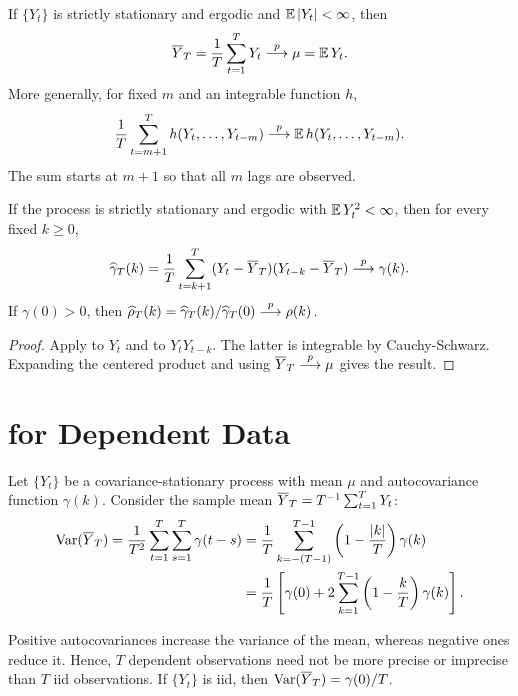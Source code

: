 \documentclass[a4paper,12pt]{article}
\begin{document}
\begin{theorem}\label{thm-ergodic}
	If $\{Y_t\}$ is strictly stationary and ergodic and $\operatorname{\mathbb{E}}|Y_t|<\infty$, then
	\begin{align}
		\overline Y_T=\frac1T\sum_{t=1}^T Y_t\overset{p}{\longrightarrow}\mu=\operatorname{\mathbb{E}} Y_t.
	\end{align}
	More generally, for fixed $m$ and an integrable function $h$,
	\begin{align}
		\frac1T\sum_{t=m+1}^T h(Y_t,\ldots,Y_{t-m})
		\overset{p}{\longrightarrow} \operatorname{\mathbb{E}} h(Y_t,\ldots,Y_{t-m}).
	\end{align}
	The sum starts at $m+1$ so that all $m$ lags are observed.
\end{theorem}

\begin{corollary}\label{cor-sample-acf}
	If the process is strictly stationary and ergodic with $\operatorname{\mathbb{E}} Y_t^2<\infty$, then for every fixed $k\ge0$,
	\begin{align}
		\widehat\gamma_T(k)
		=\frac1T\sum_{t=k+1}^T(Y_t-\overline Y_T)(Y_{t-k}-\overline Y_T)\overset{p}{\longrightarrow}\gamma(k).
	\end{align}
	If $\gamma(0)>0$, then $\widehat\rho_T(k)=\widehat\gamma_T(k)/\widehat\gamma_T(0)\overset{p}{\longrightarrow}\rho(k)$.
\end{corollary}
\begin{proof}
	Apply  to $Y_t$ and to $Y_tY_{t-k}$.
	The latter is integrable by Cauchy-Schwarz.
	Expanding the centered product and using $\overline Y_T\overset{p}{\longrightarrow}\mu$ gives the result.
\end{proof}

\section{ for Dependent Data}\label{sec-clt-dependent}

Let $\{Y_t\}$ be a covariance-stationary process with mean $\mu$ and autocovariance function $\gamma(k)$.
Consider the sample mean $\overline Y_T=T^{-1}\sum_{t=1}^T Y_t$:
\begin{align}
	\operatorname{\text{\upshape{Var}}}(\overline Y_T)
	=\frac1{T^2}\sum_{t=1}^T\sum_{s=1}^T\gamma(t-s)
	&=\frac1T\sum_{k=-(T-1)}^{T-1}\left(1-\frac{|k|}{T}\right)\gamma(k)\nonumber\\
	&=\frac1T\left[\gamma(0)+2\sum_{k=1}^{T-1}
	\left(1-\frac{k}{T}\right)\gamma(k)\right].\label{eq-mean-var}
\end{align}

\begin{remark}
	Positive autocovariances increase the variance of the mean, whereas negative ones reduce it.
	Hence, $T$ dependent observations need not be more precise or imprecise than $T$ \gls{iid} observations.
	If $\{Y_t\}$ is \gls{iid}, then $\operatorname{\text{\upshape{Var}}}(\overline Y_T)=\gamma(0)/T$.
\end{remark}
\end{document}
